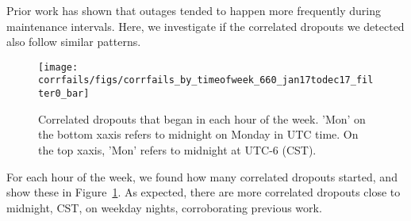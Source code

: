 Prior work has shown that outages tended to happen more frequently
during maintenance intervals. Here, we investigate if the correlated
dropouts we detected also follow similar patterns.

\begin{figure}[t]
\centering
\texttt{[image: corrfails/figs/corrfails\_by\_timeofweek\_660\_jan17todec17\_filter0\_bar]}
\caption{
\label{fig:corr_dropouts_timeofweek}
Correlated dropouts that began in each hour of the week. 'Mon' on the
bottom xaxis refers to midnight on Monday in UTC time. On the top xaxis, 'Mon' refers to midnight at UTC-6 (CST). }
\end{figure}




For each hour of the week, we found how many correlated dropouts
started, and show these in
Figure~\ref{fig:corr_dropouts_timeofweek}.
As expected, there are more
correlated dropouts close to midnight, CST, on weekday nights,
corroborating previous work.

